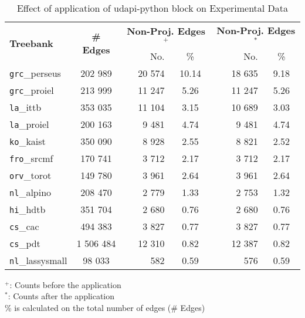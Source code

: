 \begin{table}[H]
    \centering
    \begin{tabular}{|l|c|r|c|r|c|}
    \hline
    \multirow{2}{*}{\textbf{Treebank}} &
      \multirow{2}{*}{\textbf{\# Edges}} &
      \multicolumn{2}{c|}{\textbf{Non-Proj. Edges\(^{+}\)}} &
      \multicolumn{2}{c|}{\textbf{Non-Proj. Edges\(^{*}\)}} \\
    & & No. & \% & No. & \%\\
    \hline
    \hline
    \texttt{grc}\_perseus & 202 989 & 20 574 & 10.14 & 18 635 & 9.18\\
    \texttt{grc}\_proiel & 213 999 & 11 247 & 5.26 & 11 247 & 5.26\\
    \texttt{la}\_ittb & 353 035 & 11 104 & 3.15 & 10 689 & 3.03\\
    \texttt{la}\_proiel & 200 163 & 9 481 & 4.74 & 9 481 & 4.74\\
    \texttt{ko}\_kaist & 350 090 & 8 928 & 2.55 & 8 821 & 2.52\\
    \texttt{fro}\_srcmf & 170 741 & 3 712 & 2.17 & 3 712 & 2.17\\
    \texttt{orv}\_torot & 149 780 & 3 961 & 2.64 & 3 961 & 2.64\\
    \texttt{nl}\_alpino & 208 470 & 2 779 & 1.33 & 2 753 & 1.32\\
    \texttt{hi}\_hdtb & 351 704 & 2 680 & 0.76 & 2 680 & 0.76\\
    \texttt{cs}\_cac & 494 383 & 3 827 & 0.77 & 3 827 & 0.77\\
    \hline
    \texttt{cs}\_pdt & 1 506 484 & 12 310 & 0.82 & 12 387 & 0.82\\
    \texttt{nl}\_lassysmall & 98 033 & 582 & 0.59 & 576 & 0.59\\
    \hline
    \end{tabular}
    \caption{Effect of application of udapi-python block on Experimental Data}\(^{+}\): Counts before the application \\
    \(^{*}\): Counts after the application\\\% is calculated on the total number of edges (\# Edges)
    \label{tab:treatment-results}
\end{table}


